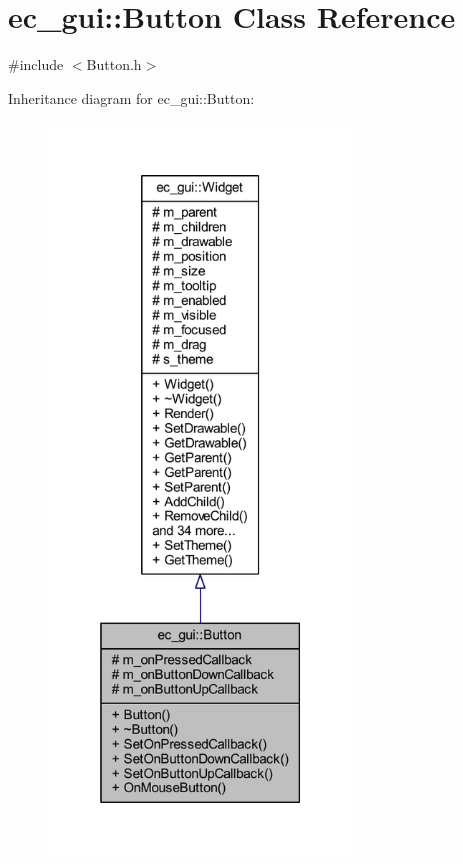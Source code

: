 \hypertarget{classec__gui_1_1_button}{}\section{ec\+\_\+gui\+:\+:Button Class Reference}
\label{classec__gui_1_1_button}


{\ttfamily \#include $<$Button.\+h$>$}



Inheritance diagram for ec\+\_\+gui\+:\+:Button\+:\nopagebreak
\begin{figure}[H]
\begin{center}
\leavevmode
\includegraphics[height=550pt]{classec__gui_1_1_button__inherit__graph}
\end{center}
\end{figure}


